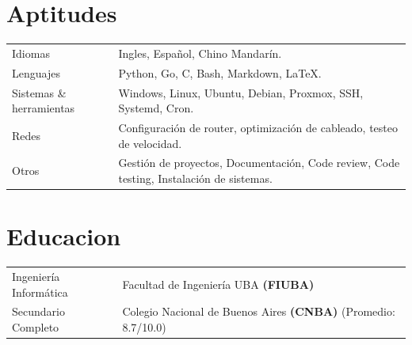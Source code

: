 \documentclass[a4paper,12pt]{article}
\begin{document}
\section{Aptitudes}
\begin{tabularx}{\linewidth}{@{}l X@{}}
Idiomas &  \normalsize{Ingles, Español, Chino Mandarín.}\\
Lenguajes  &  \normalsize{Python, Go, C, Bash, Markdown, LaTeX.}\\ 
Sistemas  \& herramientas &  \normalsize{Windows, Linux, Ubuntu, Debian, Proxmox, SSH, Systemd, Cron.}\\ 
Redes  &  \normalsize{Configuración de router, optimización de cableado, testeo de velocidad.}\\ 
Otros  &  \normalsize{Gestión de proyectos, Documentación, Code review, Code testing, Instalación de sistemas.}\\ 
\end{tabularx}

\section{Educacion}
\begin{tabularx}{\linewidth}{@{}l X@{}}	
Ingeniería Informática & Facultad de Ingeniería UBA \textbf{(FIUBA)} \hfill \normalsize  \\

Secundario Completo & Colegio Nacional de Buenos Aires \textbf{(CNBA)} \hfill (Promedio: 8.7/10.0) \\ 

\end{tabularx}



\end{document}

